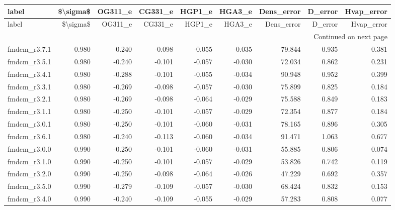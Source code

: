 \begin{longtable}{lrrrrrrrr}
\toprule
       label &  \$\textbackslash sigma\$ &  OG311\_e &  CG331\_e &  HGP1\_e &  HGA3\_e &  Dens\_error &  D\_error &  Hvap\_error \\
\midrule
\endfirsthead

\toprule
       label &  \$\textbackslash sigma\$ &  OG311\_e &  CG331\_e &  HGP1\_e &  HGA3\_e &  Dens\_error &  D\_error &  Hvap\_error \\
\midrule
\endhead
\midrule
\multicolumn{9}{r}{{Continued on next page}} \\
\midrule
\endfoot

\bottomrule
\endlastfoot
fmdcm\_r3.7.1 &     0.980 &   -0.240 &   -0.098 &  -0.055 &  -0.035 &      79.844 &    0.935 &       0.381 \\
fmdcm\_r3.5.1 &     0.980 &   -0.240 &   -0.101 &  -0.057 &  -0.030 &      72.034 &    0.862 &       0.231 \\
fmdcm\_r3.4.1 &     0.980 &   -0.288 &   -0.101 &  -0.055 &  -0.034 &      90.948 &    0.952 &       0.399 \\
fmdcm\_r3.3.1 &     0.980 &   -0.269 &   -0.098 &  -0.057 &  -0.030 &      75.899 &    0.825 &       0.184 \\
fmdcm\_r3.2.1 &     0.980 &   -0.269 &   -0.098 &  -0.064 &  -0.029 &      75.588 &    0.849 &       0.183 \\
fmdcm\_r3.1.1 &     0.980 &   -0.250 &   -0.101 &  -0.057 &  -0.029 &      72.354 &    0.877 &       0.184 \\
fmdcm\_r3.0.1 &     0.980 &   -0.250 &   -0.101 &  -0.060 &  -0.031 &      78.165 &    0.896 &       0.305 \\
fmdcm\_r3.6.1 &     0.980 &   -0.240 &   -0.113 &  -0.060 &  -0.034 &      91.471 &    1.063 &       0.677 \\
fmdcm\_r3.0.0 &     0.990 &   -0.250 &   -0.101 &  -0.060 &  -0.031 &      55.885 &    0.806 &       0.074 \\
fmdcm\_r3.1.0 &     0.990 &   -0.250 &   -0.101 &  -0.057 &  -0.029 &      53.826 &    0.742 &       0.119 \\
fmdcm\_r3.2.0 &     0.990 &   -0.250 &   -0.098 &  -0.064 &  -0.026 &      47.229 &    0.692 &       0.357 \\
fmdcm\_r3.5.0 &     0.990 &   -0.279 &   -0.109 &  -0.057 &  -0.030 &      68.424 &    0.832 &       0.153 \\
fmdcm\_r3.4.0 &     0.990 &   -0.240 &   -0.109 &  -0.055 &  -0.029 &      57.283 &    0.808 &       0.077 \\

\end{longtable}
